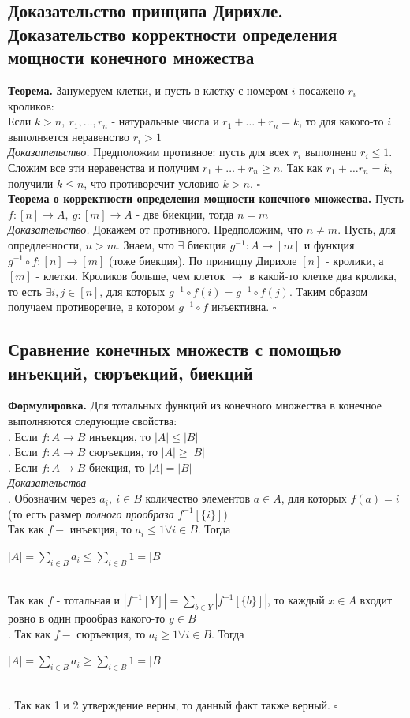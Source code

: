 \documentclass[a4paper]{article}
\newcommand{\qed}{\hfill$\square$}
\begin{document}
\subsection{Доказательство принципа Дирихле. Доказательство корректности определения мощности конечного множества}
\textbf{Теорема.}  Занумеруем клетки, и пусть в клетку с номером $i$ посажено $r_i$ кроликов:\\[2mm]
\indent Если $k>n,\ r_1,\ldots,r_n$ - натуральные числа и $r_1+\ldots+r_n=k$, то для какого-то $i$ выполняется неравенство $r_i>1$\\[2mm]
\textit{Доказательство.} Предположим противное: пусть для всех $r_i$ выполнено $r_i\leqslant1$. Сложим все эти неравенства и получим $r_1+\ldots+r_n\geqslant n$. Так как $r_1+\ldots r_n=k$, получили $k\leqslant n$, что противоречит условию $k>n$. \qed\\[2mm]
\textbf{Теорема о корректности определения мощности конечного множества.} Пусть $f: [n]\rightarrow A,\ g: [m]\rightarrow A$ - две биекции, тогда $n=m$\\[2mm]
\textit{Доказательство.} Докажем от противного. Предположим, что $n\ne m$. Пусть, для опредленности, $n>m$. Знаем, что $\exists$ биекция $g^{-1}: A\rightarrow [m]$ и функция $g^{-1}\circ f: [n]\rightarrow[m]$ (тоже биекция). По приницпу Дирихле $[n]$ - кролики, а $[m]$ - клетки. Кроликов больше, чем клеток $\rightarrow$ в какой-то клетке два кролика, то есть $\exists i,j\in[n]$, для которых $g^{-1}\circ f(i)=g^{-1}\circ f(j)$. Таким образом получаем противоречие, в котором $g^{-1}\circ f$ инъективна. \qed
\subsection{Сравнение конечных множеств с помощью инъекций, сюръекций, биекций}
\textbf{Формулировка.} Для тотальных функций из конечного множества в конечное выполняются следующие свойства:\\[2mm]
. Если $f: A\rightarrow B$ инъекция, то $|A|\leqslant|B|$\\[2mm]
. Если $f: A\rightarrow B$ сюръекция, то $|A|\geqslant|B|$\\[2mm]
. Если $f: A\rightarrow B$ биекция, то $|A|=|B|$\\[2mm]
\textit{Доказательства}\\[2mm]
. Обозначим через $a_i,\ i\in B$ количество элементов $a\in A$, для которых $f(a)=i$ (то есть размер \textit{полного прообраза} $f^{-1}[\{i\}]$)\\[2mm]
Так как $f-$ инъекция, то $a_i\leqslant1\forall i\in B$. Тогда\\[2mm]
\centerline{$|A|=\sum\limits_{i\in B} a_i\leqslant\sum\limits_{i\in B} 1=|B|$}\\[2mm]
Так как $f$ - тотальная и $|f^{-1}[Y]|=\sum\limits_{b\in Y} |f^{-1}[\{b\}]|$, то каждый $x\in A$ входит ровно в один прообраз какого-то $y\in B$\\[2mm]
. Так как $f-$ сюръекция, то $a_i\geqslant1\forall i\in B$. Тогда\\[2mm]
\centerline{$|A|=\sum\limits_{i\in B} a_i\geqslant\sum\limits_{i\in B} 1=|B|$}\\[2mm]
. Так как 1 и 2 утверждение верны, то данный факт также верный. \qed
\end{document}
